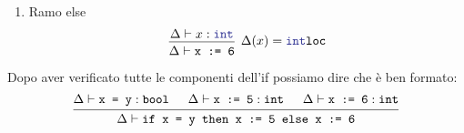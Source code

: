 \documentclass[a4paper]{article}
\begin{document}
\begin{example}
\begin{itemize}
\begin{enumerate}
        \item Ramo else
          \[
            \begin{prooftree}
              \hypo{ 
                \Delta \vdash x: \texttt{\textcolor{Blue}{int}}
              }
              \infer1[\( 
                \Delta(x) = \texttt{\textcolor{Blue}{int}loc}
              \)]{ 
                \Delta \vdash \texttt{x := 6}
              }
            \end{prooftree}
          \] 
      \end{enumerate}
      Dopo aver verificato tutte le componenti dell'if possiamo dire che è ben
      formato:
      \[
        \begin{prooftree}
          \hypo{ 
            \Delta \vdash \texttt{x = y} : \texttt{bool}
          }
          \hypo{ 
            \Delta \vdash \texttt{x := 5}: \texttt{int}
          }
          \hypo{ 
            \Delta \vdash \texttt{x := 6}: \texttt{int}
          }
          \infer3{ 
            \Delta \vdash \texttt{if x = y then x := 5 else x := 6}
          }
        \end{prooftree}
      \] 


\end{itemize}
\end{example}
\end{document}
